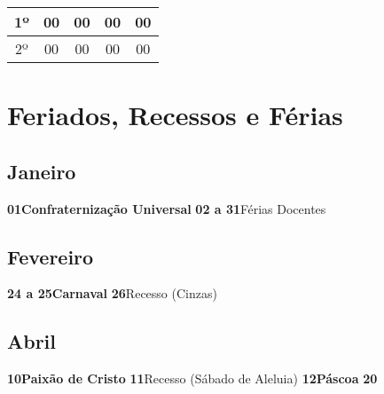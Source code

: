 \documentclass[thesis]{hmcposter}
\begin{document}
\begin{poster}
\begin{center}
\begin{table}
{\begin{tabular}{|c|c|c|c|c|}
1º & 00 & 00 & 00 & 00 \\ \hline
2º & 00 & 00 & 00 & 00 \\ \hline
\end{tabular}
}
\end{table}
\newline
\null
\newline
\end{center}
\vfill
\null
\newpage\onespacing \section{\color{hmcorange}Feriados, Recessos e Férias}\subsection{Janeiro}\textbf{01}\quad \quad \quad \quad \textbf{Confraternização Universal} \newline\textbf{02 a 31}\quad \quad Férias Docentes \newline\subsection{Fevereiro}\textbf{24 a 25}\quad \quad \textbf{Carnaval} \newline\textbf{26}\quad \quad \quad \quad Recesso (Cinzas) \newline\subsection{Abril}\textbf{10}\quad \quad \quad \quad \textbf{Paixão de Cristo} \newline\textbf{11}\quad \quad \quad \quad Recesso (Sábado de Aleluia) \newline\textbf{12}\quad \quad \quad \quad \textbf{Páscoa} \newline\textbf{20}\quad \quad 
\end{poster}
\end{document}
